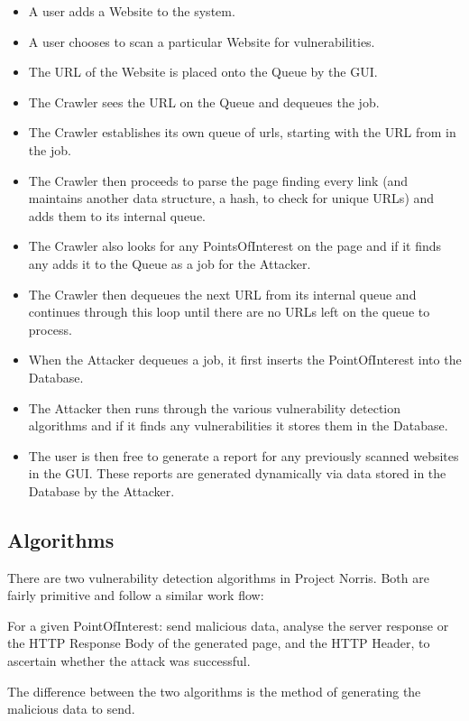 \documentclass[12pt,a4paper]{article}
\begin{document}
\begin{itemize}
    \item A user adds a Website to the system.
    \item A user chooses to scan a particular Website for vulnerabilities.
    \item The URL of the Website is placed onto the Queue by the GUI.
    \item The Crawler sees the URL on the Queue and dequeues the job.
    \item The Crawler establishes its own queue of urls, starting with the URL from in the job.
    \item The Crawler then proceeds to parse the page finding every link (and maintains another data structure, a hash, to check for unique URLs) and adds them to its internal queue.
    \item The Crawler also looks for any PointsOfInterest on the page and if it finds any adds it to the Queue as a job for the Attacker.
    \item The Crawler then dequeues the next URL from its internal queue and continues through this loop until there are no URLs left on the queue to process.
    \item When the Attacker dequeues a job, it first inserts the PointOfInterest into the Database.
    \item The Attacker then runs through the various vulnerability detection algorithms and if it finds any vulnerabilities it stores them in the Database.
    \item The user is then free to generate a report for any previously scanned websites in the GUI.  These reports are generated dynamically via data stored in the Database by the Attacker.
\end{itemize}

\subsection{Algorithms}
There are two vulnerability detection algorithms in Project Norris.  Both are fairly primitive and follow a similar work flow:

For a given PointOfInterest: send malicious data, analyse the server response or the HTTP Response Body of the generated page, and the HTTP Header, to ascertain whether the attack was successful.

The difference between the two algorithms is the method of generating the malicious data to send.
\end{document}
